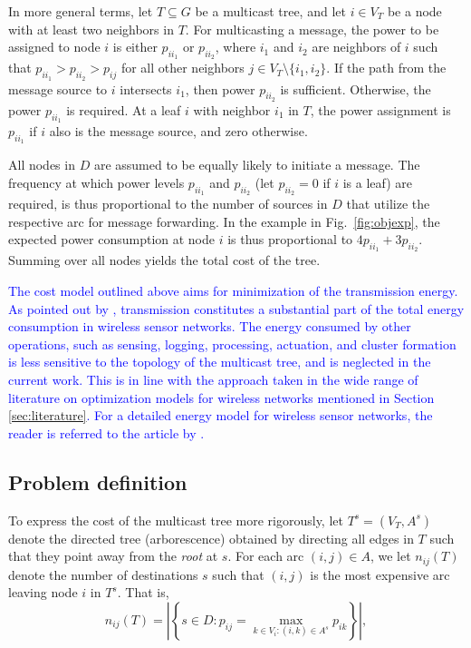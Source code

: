 In more general terms, let $T\subseteq G$ be a multicast tree, and let $i\in V_T$ be a node with at least two neighbors in $T$.
For multicasting a message, the power to be assigned to node $i$ is either $p_{ii_1}$ or $p_{ii_2}$, where $i_1$ and $i_2$ are neighbors of $i$ such that
$p_{ii_1}>p_{ii_2}>p_{ij}$ for all other neighbors $j\in V_T\setminus\{i_1,i_2\}$.
If the path from the message source to $i$ intersects $i_1$, then power $p_{ii_2}$ is sufficient.
Otherwise, the power $p_{ii_1}$ is required.
At a leaf $i$ with neighbor $i_1$ in $T$, the power assignment is $p_{ii_1}$ if $i$ also is the message source, and zero otherwise.

All nodes in $D$ are assumed to be equally likely to initiate a message.
The frequency at which power levels $p_{ii_1}$ and $p_{ii_2}$ (let $p_{ii_2}=0$ if $i$ is a leaf) are required,
is thus proportional to the number of sources in $D$ that utilize the respective arc for message forwarding.
In the example in Fig.\ \ref{fig:objexp}, the expected power consumption at node $i$ is thus proportional to $4p_{ii_1} + 3p_{ii_2}$.
Summing over all nodes yields the total cost of the tree.

\textcolor{blue}{
The cost model outlined above aims for minimization of the transmission energy.
As pointed out by \citet{halgamuge}, transmission constitutes a substantial part of the total energy consumption in wireless sensor networks.
The energy consumed by other operations, such as sensing, logging, processing, actuation, and cluster formation is less sensitive to the topology
of the multicast tree, and is neglected in the current work.
This is in line with the approach taken in the wide range of literature on optimization models for wireless networks mentioned in Section \ref{sec:literature}.
For a detailed energy model for wireless sensor networks, the reader is referred to the article by \citet{halgamuge}.}

\subsection{Problem definition} \label{sec:probdef}

To express the cost of the multicast tree more rigorously, let $T^s=(V_T,A^s)$ denote the directed tree (arborescence) obtained by directing all edges in $T$ such that they point away from the \emph{root} at $s$.
For each arc $(i,j)\in A$, we let $n_{ij}(T)$ denote the number of destinations $s$ such that $(i,j)$ is the most expensive arc leaving node $i$ in $T^s$.
That is,
\[
  n_{ij}(T) = \left|\left\{s\in D: p_{ij}=\max_{k\in V_i: (i,k)\in A^s}p_{ik}\right\}\right|,
\]

